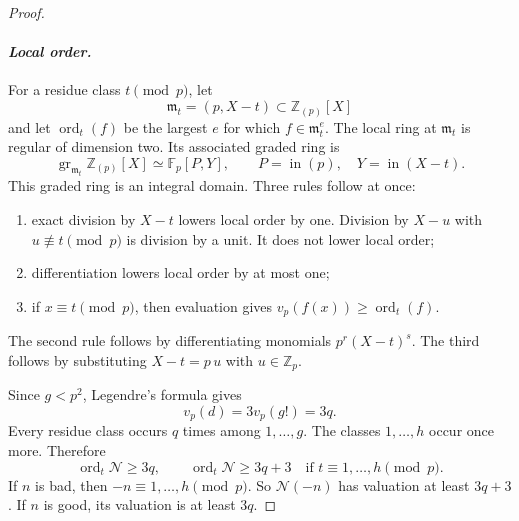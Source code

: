 \begin{proof}
\paragraph{\emph{Local order.}}
For a residue class $t\pmod p$, let
\[
 \mathfrak m_t=(p,X-t)\subset\mathbb Z_{(p)}[X]
\]
and let $\operatorname{ord}_t(f)$ be the largest $e$ for which
$f\in\mathfrak m_t^e$.  The local ring at $\mathfrak m_t$ is regular of
dimension two.  Its associated graded ring is
\begin{equation}
 \operatorname{gr}_{\mathfrak m_t}\mathbb Z_{(p)}[X]
 \simeq\mathbb F_p[P,Y],
 \qquad P=\operatorname{in}(p),\quad Y=\operatorname{in}(X-t).
 \label{eq:insert-associated-graded}
\end{equation}
This graded ring is an integral domain.  Three rules follow at once:
\begin{enumerate}
\item exact division by $X-t$ lowers local order by one.  Division by
  $X-u$ with $u\not\equiv t\pmod p$ is division by a unit.  It does not
  lower local order;
\item differentiation lowers local order by at most one;
\item if $x\equiv t\pmod p$, then evaluation gives
  $v_p(f(x))\geq\operatorname{ord}_t(f)$.
\end{enumerate}
The second rule follows by differentiating monomials
$p^r(X-t)^s$.  The third follows by substituting
$X-t=p\,u$ with $u\in\mathbb Z_p$.

Since $g<p^2$, Legendre's formula gives
\begin{equation}
 v_p(d)=3v_p(g!)=3q.
 \label{eq:insert-d-valuation}
\end{equation}
Every residue class occurs $q$ times among $1,\ldots,g$.  The classes
$1,\ldots,h$ occur once more.  Therefore
\begin{equation}
 \operatorname{ord}_t\mathcal N\geq3q,
 \qquad
 \operatorname{ord}_t\mathcal N\geq3q+3
 \quad\text{if }t\equiv1,\ldots,h\pmod p.
 \label{eq:insert-N-orders}
\end{equation}
If $n$ is bad, then $-n\equiv1,\ldots,h\pmod p$.  So
$\mathcal N(-n)$ has valuation at least $3q+3$.  If $n$ is good, its
valuation is at least $3q$.


\end{proof}
